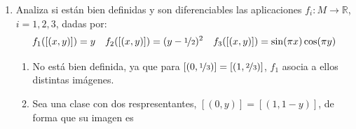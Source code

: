 \begin{ejer}
\begin{enumerate}
\begin{sol}
            Comprobemos que son atlas. Claramente, $M = U \cup V$ ya que uno cubre lo que otro no. Para comprobar la compatibilidad de la funciones veamos sus inversas. 
            $$\bt 
            \varphi^{-1} : & (0,1) \times (0,1) \arrow{r} & U \\[-5mm] & (x,y) \arrow[mapsto]{r} & \left[(x,y)\right] \\ \psi^{-1}: & (-\nicefrac{1}{2},\nicefrac{1}{2}) \times (0,1) \arrow{r} & V \\[-8mm] 
            & (x,y) \arrow[mapsto]{r} & \begin{cases}
                [x,y] \quad \quad \quad 0 \leq x < \nicefrac{1}{2} \\ [x+1, 1-y] \quad -\nicefrac{1}{2} < x \leq 0
            \end{cases}
            \et$$
            y ahora $U \cap V = \modulo{((0, 1) - \{\nicefrac{1}{2}\} \times (0, 1))}{\sim}$, de forma que 
            $$\psi \circ \varphi^{-1}(x,y) = \psi([x,y])=\begin{cases}
                (x,y) & 0< x< \nicefrac{1}{2} \\ (x-1,1-y)& \nicefrac{1}{2}< x < 1
            \end{cases}$$
            que es diferenciable $\mathcal C^{\infty}$, ya que lo es cada componente conexa, excluyendo $0,1, \nicefrac{1}{2}$. De la misma forma
            $$\varphi^{-1} \circ \psi (x,y)=\begin{cases}
                (x,y) & 0< x< \nicefrac{1}{2} \\ (x-1,1-y)& -\nicefrac{1}{2}< x < 0
            \end{cases}$$
            es tambi\'en diferenciable, y $\{(U,\varphi),(V,\psi)\}$ es un atlas 2-dimensional $\mathcal{C}^{\infty}$ de $M$, pudiendo extenderlo a uno mayor maximal respecto a la condici\'on de compatibilidad.
        \end{sol}
        \item Analiza si est\'an bien definidas y son diferenciables las aplicaciones $f_i : M \to \mathbb R$, $i = 1, 2, 3$, dadas por:
        $$f_1([(x,y)])=y \quad f_2([(x,y)]) = (y-\nicefrac{1}{2})^2 \quad f_3([(x,y)])=\sin(\pi x) \cos(\pi y)$$
        \begin{sol}
            \begin{enumerate}
                \item No est\'a bien definida, ya que para $[(0,\nicefrac{1}{3})] = [(1,\nicefrac{2}{3})]$, $f_1$ asocia a ellos distintas im\'agenes.
                \item Sea una clase con dos respresentantes, $[(0,y)] = [(1,1-y)]$, de forma que su imagen es 

\end{enumerate}
\end{sol}
\end{enumerate}
\end{ejer}
